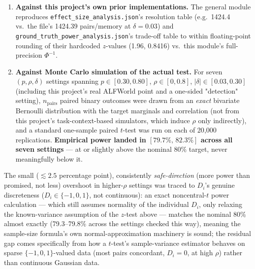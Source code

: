 \begin{enumerate}
\item \textbf{Against this project's own prior implementations.} The
  general module reproduces \texttt{effect\_size\_analysis.json}'s
  resolution table (e.g.\ 1424.4 vs.\ the file's 1424.39 pairs/memory at
  $\delta=0.03$) and \texttt{ground\_truth\_power\_analysis.json}'s
  trade-off table to within floating-point rounding of their hardcoded
  $z$-values (1.96, 0.8416) vs.\ this module's full-precision $\Phi^{-1}$.
\item \textbf{Against Monte Carlo simulation of the actual test.} For seven
  $(p,\rho,\delta)$ settings spanning $p\in[0.30,0.80]$,
  $\rho\in[0,0.8]$, $|\delta|\in[0.03,0.30]$ (including this project's real
  ALFWorld point and a one-sided "detection" setting), $n_{\text{pairs}}$
  paired binary outcomes were drawn from an \emph{exact} bivariate Bernoulli
  distribution with the target marginals and correlation (not from this
  project's task-context-based simulators, which induce $\rho$ only
  indirectly), and a standard one-sample paired $t$-test was run on each of
  20{,}000 replications. \textbf{Empirical power landed in
  $[79.7\%,\,82.3\%]$ across all seven settings} — at or slightly above the
  nominal 80\% target, never meaningfully below it.
\end{enumerate}

The small ($\lesssim2.5$ percentage point), consistently
\emph{safe-direction} (more power than promised, not less) overshoot in
higher-$\rho$ settings was traced to $D_i$'s genuine discreteness ($D_i\in
\{-1,0,1\}$, not continuous): an exact noncentral-$t$ power calculation —
which still assumes normality of the individual $D_i$, only relaxing the
known-variance assumption of the $z$-test above — matches the nominal 80\%
almost exactly (79.3--79.8\% across the settings checked this way), meaning
the sample-size formula's own normal-approximation machinery is sound; the
residual gap comes specifically from how a $t$-test's sample-variance
estimator behaves on sparse $\{-1,0,1\}$-valued data (most pairs concordant,
$D_i=0$, at high $\rho$) rather than continuous Gaussian data.

